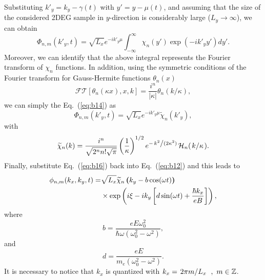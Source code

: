 \documentclass[
 reprint,
 amsmath,amssymb,
 aps,
 prb,
]{revtex4-2}
\begin{document}
Substituting ${k'_y} = k_y -\gamma(t)$ with $y' = y -\mu(t)$, and assuming that the size of the considered 2DEG sample in $y$-direction is considerably large ($L_y \rightarrow \infty$), we can obtain
\begin{equation} \label{eq:b14}
  \Phi_{n,m}({k'_y} ,t) =
  {\sqrt{L_x}} e^{-i {k'_y}\mu}
  \int_{-\infty}^{\infty} \chi_{n}(y') \exp(-i{k'_y} y') dy'.
\end{equation}
Moreover, we can identify that the above integral represents the Fourier transform of $\chi_n$ functions. In addition, using the symmetric conditions of the Fourier transform for Gauss-Hermite functions $\theta_n(x)$ \cite{celeghini21}
\begin{equation} \label{eq:b15}
  \mathcal{FT}[\theta_n(\kappa x),x,k] = \frac{i^n}{|\kappa|}\theta_n(k/\kappa),
\end{equation}
we can simply the Eq.~(\ref{eq:b14}) as
\begin{equation} \label{eq:b16}
  \Phi_{n,m}({k'_y} ,t) =
  \sqrt{L_x} e^{-i {k'_y}\mu} \widetilde{\chi}_n(k'_y),
\end{equation}
with
\begin{equation} \label{eq:b17}
  \widetilde{\chi}_{n}(k) =
  \frac{i^n}{\sqrt{2^{n} n! \sqrt{\pi}}}
  \left(\frac{1}{\kappa} \right)^{1/2}
  e^{-\flatfrac{k^2}{(2 \kappa^2)}}
  \mathcal{H}_n (\flatfrac{k}{\kappa}).
\end{equation}
Finally, substitute Eq.~(\ref{eq:b16}) back into Eq.~(\ref{eq:b12}) and this leads to
\begin{equation} \label{eq:b18}
  \begin{aligned}
    \phi_{n,m}(k_x,k_y,t)  = &
    {\sqrt{L_x}} \widetilde{\chi}_n \bm{\left(} k_y - b\cos(\omega t)\bm{\right)} \\
    & \times
    \exp \left(
      i\xi -ik_y  \left[d\sin(\omega t) + \frac{\hbar k_x}{eB} \right]
    \right),
  \end{aligned}
\end{equation}
where
\begin{equation} \label{eq:b19}
  b =
  \frac{eE\omega_0^2}{\hbar\omega(\omega_0^2 - \omega^2)},
\end{equation}
and
\begin{equation} \label{eq:b20}
  d =
 \frac{eE}{m_e(\omega_0^2 - \omega^2)}.
\end{equation}
It is necessary to notice that $k_x$ is quantized with $k_x = \flatfrac{2\pi m}{L_x} ~,~ m \in \mathbb{Z}$.
\end{document}
